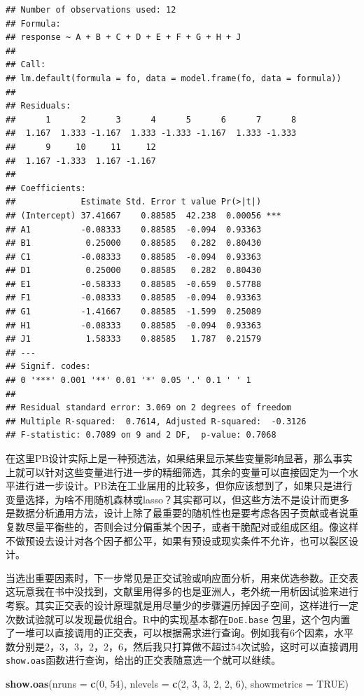 \documentclass[]{tufte-book}
\newenvironment{Shaded}{}{}
\newcommand{\DataTypeTok}[1]{\textcolor[rgb]{0.56,0.13,0.00}{#1}}
\newcommand{\DecValTok}[1]{\textcolor[rgb]{0.25,0.63,0.44}{#1}}
\newcommand{\KeywordTok}[1]{\textcolor[rgb]{0.00,0.44,0.13}{\textbf{#1}}}
\newcommand{\NormalTok}[1]{#1}
\newcommand{\OtherTok}[1]{\textcolor[rgb]{0.00,0.44,0.13}{#1}}
\begin{document}
\begin{verbatim}
## Number of observations used: 12 
## Formula:
## response ~ A + B + C + D + E + F + G + H + J
## 
## Call:
## lm.default(formula = fo, data = model.frame(fo, data = formula))
## 
## Residuals:
##      1      2      3      4      5      6      7      8 
##  1.167  1.333 -1.167  1.333 -1.333 -1.167  1.333 -1.333 
##      9     10     11     12 
##  1.167 -1.333  1.167 -1.167 
## 
## Coefficients:
##             Estimate Std. Error t value Pr(>|t|)    
## (Intercept) 37.41667    0.88585  42.238  0.00056 ***
## A1          -0.08333    0.88585  -0.094  0.93363    
## B1           0.25000    0.88585   0.282  0.80430    
## C1          -0.08333    0.88585  -0.094  0.93363    
## D1           0.25000    0.88585   0.282  0.80430    
## E1          -0.58333    0.88585  -0.659  0.57788    
## F1          -0.08333    0.88585  -0.094  0.93363    
## G1          -1.41667    0.88585  -1.599  0.25089    
## H1          -0.08333    0.88585  -0.094  0.93363    
## J1           1.58333    0.88585   1.787  0.21579    
## ---
## Signif. codes:  
## 0 '***' 0.001 '**' 0.01 '*' 0.05 '.' 0.1 ' ' 1
## 
## Residual standard error: 3.069 on 2 degrees of freedom
## Multiple R-squared:  0.7614,	Adjusted R-squared:  -0.3126 
## F-statistic: 0.7089 on 9 and 2 DF,  p-value: 0.7068
\end{verbatim}

在这里PB设计实际上是一种预选法，如果结果显示某些变量影响显著，那么事实上就可以针对这些变量进行进一步的精细筛选，其余的变量可以直接固定为一个水平进行进一步设计。PB法在工业届用的比较多，但你应该想到了，如果只是进行变量选择，为啥不用随机森林或lasso？其实都可以，但这些方法不是设计而更多是数据分析通用方法，设计上除了最重要的随机性也是要考虑各因子贡献或者说重复数尽量平衡些的，否则会过分偏重某个因子，或者干脆配对或组成区组。像这样不做预设去设计对各个因子都公平，如果有预设或现实条件不允许，也可以裂区设计。

当选出重要因素时，下一步常见是正交试验或响应面分析，用来优选参数。正交表这玩意我在书中没找到，文献里用得多的也是亚洲人，老外统一用析因试验来进行考察。其实正交表的设计原理就是用尽量少的步骤遍历掉因子空间，这样进行一定次数试验就可以发现最优组合。R中的实现基本都在\texttt{DoE.base} 包里，这个包内置了一堆可以直接调用的正交表，可以根据需求进行查询。例如我有6个因素，水平数分别是2，3，3，2，2，6，然后我只打算做不超过54次试验，这时可以直接调用\texttt{show.oas}函数进行查询，给出的正交表随意选一个就可以继续。

\begin{Shaded}
\begin{Highlighting}[]
\KeywordTok{show.oas}\NormalTok{(}\DataTypeTok{nruns =} \KeywordTok{c}\NormalTok{(}\DecValTok{0}\NormalTok{, }\DecValTok{54}\NormalTok{), }\DataTypeTok{nlevels =} \KeywordTok{c}\NormalTok{(}\DecValTok{2}\NormalTok{, }\DecValTok{3}\NormalTok{, }\DecValTok{3}\NormalTok{, }\DecValTok{2}\NormalTok{, }\DecValTok{2}\NormalTok{, }\DecValTok{6}\NormalTok{), }\DataTypeTok{showmetrics =} \OtherTok{TRUE}\NormalTok{)}
\end{Highlighting}
\end{Shaded}
\end{document}

